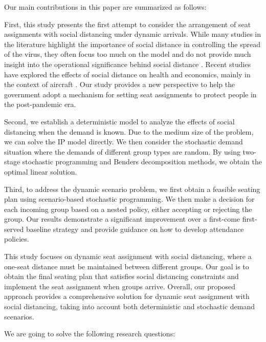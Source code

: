 
Our main contributions in this paper are summarized as follows:

First, this study presents the first attempt to consider the arrangement of seat assignments with social distancing under dynamic arrivals. While many studies in the literature highlight the importance of social distance in controlling the spread of the virus, they often focus too much on the model and do not provide much insight into the operational significance behind social distance \cite{barry2021optimal, fischetti2021safe}. Recent studies have explored the effects of social distance on health and economics, mainly in the context of aircraft \cite{salari2020social, ghorbani2020model, salari2022social}. Our study provides a new perspective to help the government adopt a mechanism for setting seat assignments to protect people in the post-pandemic era.

Second, we establish a deterministic model to analyze the effects of social distancing when the demand is known. Due to the medium size of the problem, we can solve the IP model directly. We then consider the stochastic demand situation where the demands of different group types are random. By using two-stage stochastic programming and Benders decomposition methods, we obtain the optimal linear solution.

Third, to address the dynamic scenario problem, we first obtain a feasible seating plan using scenario-based stochastic programming. We then make a decision for each incoming group based on a nested policy, either accepting or rejecting the group. Our results demonstrate a significant improvement over a first-come first-served baseline strategy and provide guidance on how to develop attendance policies.

This study focuses on dynamic seat assignment with social distancing, where a one-seat distance must be maintained between different groups. Our goal is to obtain the final seating plan that satisfies social distancing constraints and implement the seat assignment when groups arrive. Overall, our proposed approach provides a comprehensive solution for dynamic seat assignment with social distancing, taking into account both deterministic and stochastic demand scenarios.

We are going to solve the following research questions:

